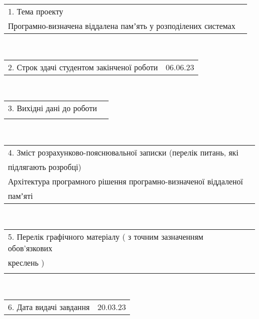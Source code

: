 \documentclass[14pt]{article}
\begin{document}
\fontsize{14}{17}\selectfont
\noindent
\begin{tabularx}{\textwidth}{l X}
    1. Тема проекту\\
    Програмно-визначена віддалена памʼять у розподілених системах\\
    \hline
\end{tabularx}
\\
\begin{tabularx}{\textwidth}{l X}
2. Строк здачі студентом закінченої роботи & 06.06.23\\
\cline{2-2}
\end{tabularx}
\\
\begin{tabularx}{\textwidth}{l X}
    3. Вихідні дані до роботи\\
    \\
    \hline
\end{tabularx}
\\
\begin{tabularx}{\textwidth}{l X}
    4. Зміст розрахунково-пояснювальної записки (перелік питань, які\\підлягають розробці)\\
    Архітектура програмного рішення програмно-визначеної віддаленої\\памʼяті\\
\end{tabularx}
\\
\begin{tabularx}{\textwidth}{l X}
    5.  Перелік графічного матеріалу ( з точним зазначенням обов’язкових\\ креслень )\\
    \\
    \hline
\end{tabularx}
\\
\begin{tabularx}{\textwidth}{l X}
    6. Дата видачі завдання & 20.03.23\\
\cline{2-2}
\end{tabularx}

\thispagestyle{empty}

\pagebreak
\end{document}
